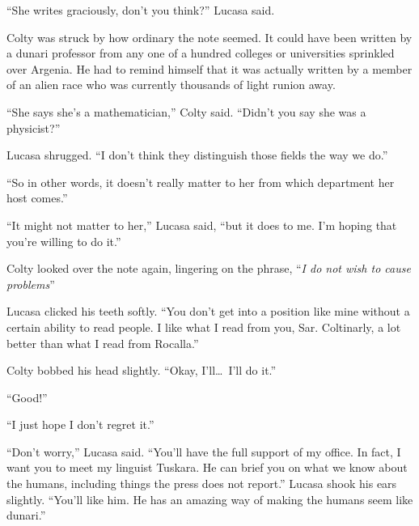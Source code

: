 ``She writes graciously, don't you think?'' Lucasa said.

Colty was struck by how ordinary the note seemed. It could have been written by a dunari
professor from any one of a hundred colleges or universities sprinkled over Argenia. He had to
remind himself that it was actually written by a member of an alien race who was currently
thousands of light runion away.

``She says she's a mathematician,'' Colty said. ``Didn't you say she was a physicist?''

Lucasa shrugged. ``I don't think they distinguish those fields the way we do.''

``So in other words, it doesn't really matter to her from which department her host comes.''

``It might not matter to her,'' Lucasa said, ``but it does to me. I'm hoping that you're
willing to do it.''

Colty looked over the note again, lingering on the phrase, ``\textit{I do not wish to cause
  problems}''

Lucasa clicked his teeth softly. ``You don't get into a position like mine without a certain
ability to read people. I like what I read from you, Sar. Coltinarly, a lot better than what I
read from Rocalla.''

Colty bobbed his head slightly. ``Okay, I'll\ldots\ I'll do it.''

``Good!''

``I just hope I don't regret it.''

``Don't worry,'' Lucasa said. ``You'll have the full support of my office. In fact, I want you
to meet my linguist Tuskara. He can brief you on what we know about the humans, including things
the press does not report.'' Lucasa shook his ears slightly. ``You'll like him. He has an
amazing way of making the humans seem like dunari.''
